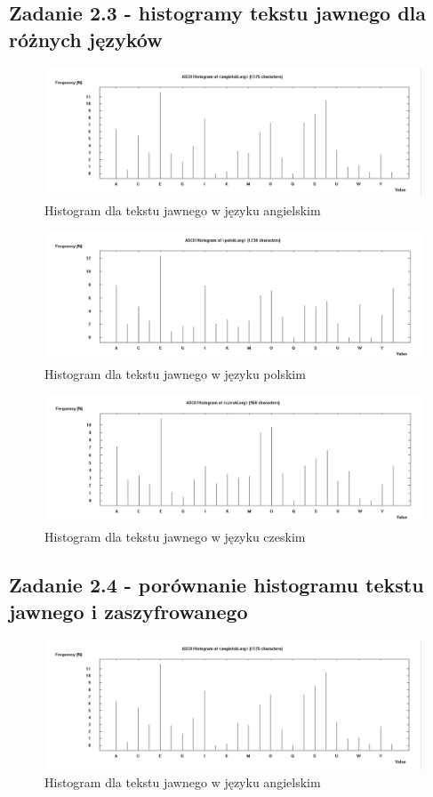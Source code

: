 \documentclass{article}
\begin{document}
\subsection*{Zadanie 2.3 - histogramy tekstu jawnego dla różnych języków}
\begin{figure}[H]
    \centering
    \includegraphics[width=\textwidth]{angielski_histogram.png}
    \caption{Histogram dla tekstu jawnego w języku angielskim}
\end{figure}
\begin{figure}[H]
    \centering
    \includegraphics[width=\textwidth]{polski_hisogram.png}
    \caption{Histogram dla tekstu jawnego w języku polskim}
\end{figure}
\begin{figure}[H]
    \centering
    \includegraphics[width=\textwidth]{czeski_hisogram.png}
    \caption{Histogram dla tekstu jawnego w języku czeskim}
\end{figure}
\subsection*{Zadanie 2.4 - porównanie histogramu tekstu jawnego i zaszyfrowanego}
\begin{figure}[H]
    \centering
    \includegraphics[width=\textwidth]{angielski_histogram.png}
    \caption{Histogram dla tekstu jawnego w języku angielskim}
\end{figure}
\end{document}
